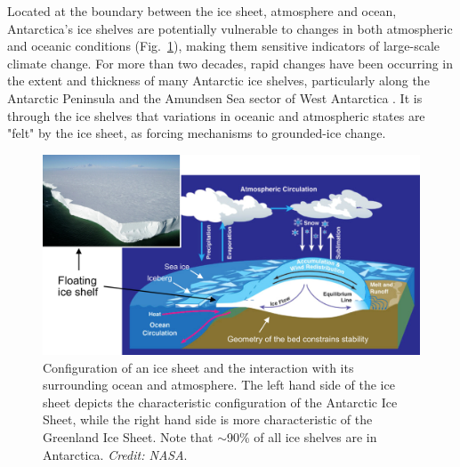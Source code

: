Located at the boundary between the ice sheet, atmosphere and ocean,
Antarctica's ice shelves are potentially vulnerable to changes in both
atmospheric and oceanic conditions (Fig.~\ref{fig:ice-sheet-configuration}), making them sensitive indicators of
large-scale climate change. For more than two decades, rapid
changes have been occurring in the extent and thickness of many Antarctic ice
shelves, particularly along the Antarctic Peninsula and the Amundsen Sea
sector of West Antarctica \parencite{Cook2010, Pritchard2012, Shepherd2010,
Wingham2009, Zwally2005, Fricker2012}. It is through the ice shelves that variations in oceanic and atmospheric states are "felt" by the ice sheet, as forcing mechanisms to grounded-ice change.


\begin{figure}[!ht]
  \includegraphics[width=\textwidth]{img/ice_sheet_configuration2.png} %
  \caption[Configuration of an ice sheet and the interaction]{
  \ssp \footnotesize
  Configuration of an ice sheet and the interaction with its surrounding ocean and atmosphere. The left hand side of the ice sheet depicts the characteristic configuration of the Antarctic Ice Sheet, while the right hand side is more characteristic of the Greenland Ice Sheet. Note that $\sim$90\% of all ice shelves are in Antarctica. {\it Credit: NASA}.
  }
  \label{fig:ice-sheet-configuration}
\end{figure}


